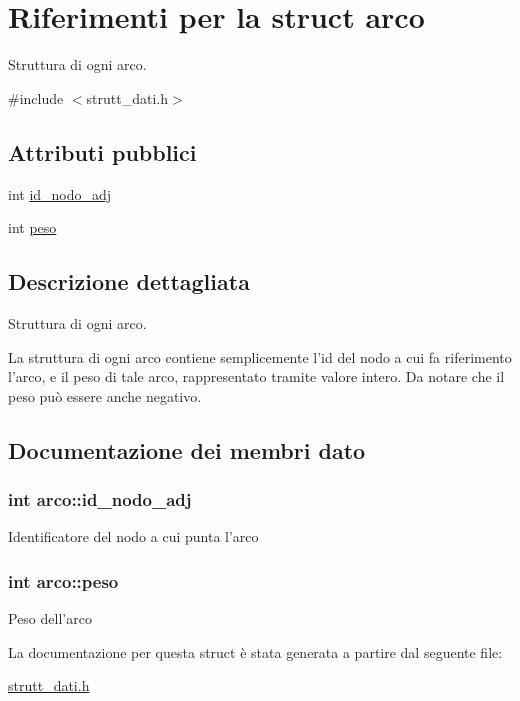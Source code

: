 \hypertarget{structarco}{\section{Riferimenti per la struct arco}
\label{structarco}
}


Struttura di ogni arco.  




{\ttfamily \#include $<$strutt\+\_\+dati.\+h$>$}

\subsection*{Attributi pubblici}
\begin{DoxyCompactItemize}
\item 
int \hyperlink{structarco_ad9b7c14e1afd37cc4c416267859c0fd7}{id\+\_\+nodo\+\_\+adj}
\item 
int \hyperlink{structarco_a3d3e3a63742e8fbaf47a728e066eca98}{peso}
\end{DoxyCompactItemize}


\subsection{Descrizione dettagliata}
Struttura di ogni arco. 

La struttura di ogni arco contiene semplicemente l'id del nodo a cui fa riferimento l'arco, e il peso di tale arco, rappresentato tramite valore intero. Da notare che il peso può essere anche negativo. 

\subsection{Documentazione dei membri dato}
\hypertarget{structarco_ad9b7c14e1afd37cc4c416267859c0fd7}{
\subsubsection[{id\+\_\+nodo\+\_\+adj}]{\setlength{\rightskip}{0pt plus 5cm}int arco\+::id\+\_\+nodo\+\_\+adj}}\label{structarco_ad9b7c14e1afd37cc4c416267859c0fd7}
Identificatore del nodo a cui punta l'arco \hypertarget{structarco_a3d3e3a63742e8fbaf47a728e066eca98}{
\subsubsection[{peso}]{\setlength{\rightskip}{0pt plus 5cm}int arco\+::peso}}\label{structarco_a3d3e3a63742e8fbaf47a728e066eca98}
Peso dell'arco 

La documentazione per questa struct è stata generata a partire dal seguente file\+:\begin{DoxyCompactItemize}
\item 
\hyperlink{strutt__dati_8h}{strutt\+\_\+dati.\+h}\end{DoxyCompactItemize}
